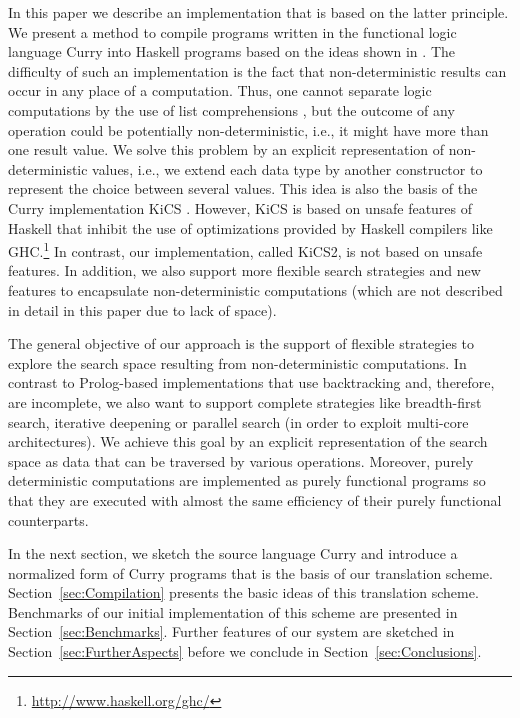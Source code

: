 \documentclass{llncs}
\begin{document}
In this paper we describe an implementation that is based
on the latter principle. We present a method to compile
programs written in the functional logic language Curry \cite{Hanus06Curry}
into Haskell programs based on the ideas shown
in \cite{BrasselFischer08IFL}.
The difficulty of such an implementation is the fact
that non-deterministic results can occur in any place of a
computation. Thus, one cannot separate logic computations
by the use of list comprehensions \cite{Wadler85},
but the outcome of any operation could be potentially non-deterministic,
i.e., it might have more than one result value.
We solve this problem by an explicit representation of
non-deterministic values, i.e., we extend each data type by
another constructor to represent the choice between several values.
This idea is also the basis of the Curry implementation KiCS
\cite{BrasselHuch07,BrasselHuch09}.
However, KiCS is based on unsafe features of Haskell
that inhibit the use of optimizations provided by Haskell compilers
like GHC.\footnote{\url{http://www.haskell.org/ghc/}}
In contrast, our implementation, called KiCS2, is not based on unsafe features.
In addition, we also support more flexible search strategies
and new features to encapsulate non-deterministic computations
(which are not described in detail in this paper due to lack of space).

The general objective of our approach is the support
of flexible strategies to explore the search space
resulting from non-deterministic computations.
In contrast to Prolog-based implementations
that use backtracking and, therefore, are incomplete,
we also want to support complete strategies like breadth-first search,
iterative deepening or parallel search (in order to exploit
multi-core architectures). We achieve this goal by an
explicit representation of the search space as data
that can be traversed by various operations.
Moreover, purely deterministic computations
are implemented as purely functional programs so that
they are executed with almost the same efficiency
of their purely functional counterparts.

In the next section, we sketch the source language Curry
and introduce a normalized form of Curry programs that is the
basis of our translation scheme.
Section~\ref{sec:Compilation} presents the basic ideas
of this translation scheme.
Benchmarks of our initial implementation of this scheme
are presented in Section~\ref{sec:Benchmarks}.
Further features of our system are sketched in
Section~\ref{sec:FurtherAspects}
before we conclude in Section~\ref{sec:Conclusions}.
\end{document}
